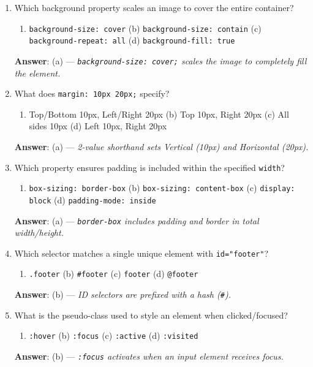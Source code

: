 \begin{enumerate}[leftmargin=1.5em]
    \item Which background property scales an image to cover the entire container?
    \begin{enumerate}[label=(\alph*)]
        \item \texttt{background-size: cover} \quad (b) \texttt{background-size: contain} \quad (c) \texttt{background-repeat: all} \quad (d) \texttt{background-fill: true}
    \end{enumerate}
    \textbf{Answer}: (a) --- \textit{\texttt{background-size: cover;} scales the image to completely fill the element.}

    \item What does \texttt{margin: 10px 20px;} specify?
    \begin{enumerate}[label=(\alph*)]
        \item Top/Bottom 10px, Left/Right 20px \quad (b) Top 10px, Right 20px \quad (c) All sides 10px \quad (d) Left 10px, Right 20px
    \end{enumerate}
    \textbf{Answer}: (a) --- \textit{2-value shorthand sets Vertical (10px) and Horizontal (20px).}

    \item Which property ensures padding is included within the specified \texttt{width}?
    \begin{enumerate}[label=(\alph*)]
        \item \texttt{box-sizing: border-box} \quad (b) \texttt{box-sizing: content-box} \quad (c) \texttt{display: block} \quad (d) \texttt{padding-mode: inside}
    \end{enumerate}
    \textbf{Answer}: (a) --- \textit{\texttt{border-box} includes padding and border in total width/height.}

    \item Which selector matches a single unique element with \texttt{id="footer"}?
    \begin{enumerate}[label=(\alph*)]
        \item \texttt{.footer} \quad (b) \texttt{\#footer} \quad (c) \texttt{footer} \quad (d) \texttt{@footer}
    \end{enumerate}
    \textbf{Answer}: (b) --- \textit{ID selectors are prefixed with a hash (\texttt{\#}).}

    \item What is the pseudo-class used to style an element when clicked/focused?
    \begin{enumerate}[label=(\alph*)]
        \item \texttt{:hover} \quad (b) \texttt{:focus} \quad (c) \texttt{:active} \quad (d) \texttt{:visited}
    \end{enumerate}
    \textbf{Answer}: (b) --- \textit{\texttt{:focus} activates when an input element receives focus.}
\end{enumerate}

